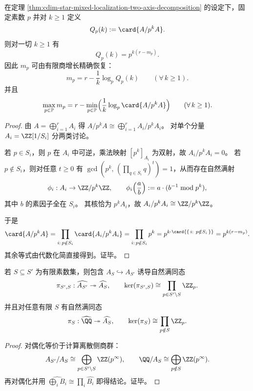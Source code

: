 \begin{theorem}[素幂粗分辨率的有限商增长谱与素数多重度反演]\label{thm:cdim-star-mixed-localization-pk-growth-inversion}
在定理 \ref{thm:cdim-star-mixed-localization-two-axis-decomposition} 的设定下，固定素数 \(p\) 并对 \(k\ge 1\) 定义
\[
Q_p(k):=\card{A/p^{k}A}.
\]
则对一切 \(k\ge 1\) 有
\[
Q_p(k)=p^{k(r-m_p)}.
\]
因此 \(m_p\) 可由有限商增长精确恢复：
\[
m_p=r-\frac{1}{k}\log_{p}Q_p(k)\qquad(\forall\,k\ge 1).
\]
并且
\[
\max_{p\in\mathbb P}m_p
=
r-\min_{p\in\mathbb P}\Bigl(\frac{1}{k}\log_p\card{A/p^kA}\Bigr)\qquad(\forall\,k\ge 1).
\]
\end{theorem}
\begin{proof}
由 \(A=\bigoplus_{i=1}^{r}A_i\) 得 \(A/p^{k}A\cong\bigoplus_{i=1}^{r}A_i/p^{k}A_i\)。
对单个分量 \(A_i=\ZZ[1/S_i]\) 分两类讨论。
\par
若 \(p\in S_i\)，则 \(p\) 在 \(A_i\) 中可逆，乘法映射 \([p^k]_{A_i}\) 为双射，故 \(A_i/p^{k}A_i=0\)。
若 \(p\notin S_i\)，则对任意 \(t\ge 0\) 有 \(\gcd(p^k,\,(\prod_{q\in S_i}q)^t)=1\)，从而存在自然满射
\[
\phi_i:A_i\to \ZZ/p^{k}\ZZ,
\qquad
\phi_i\!\left(\frac{a}{b}\right):=a\cdot(b^{-1}\bmod p^{k}),
\]
其中 \(b\) 的素因子全在 \(S_i\)。
其核恰为 \(p^{k}A_i\)，故 \(A_i/p^{k}A_i\cong \ZZ/p^{k}\ZZ\)。
\par
于是
\[
\card{A/p^{k}A}
=\prod_{i:\,p\notin S_i}\card{A_i/p^{k}A_i}
=\prod_{i:\,p\notin S_i}p^{k}
=p^{k\cdot \card{\{\,i:\ p\notin S_i\,\}}}
=p^{k(r-m_p)}.
\]
其余等式由代数化简直接得到。证毕。
\end{proof}

\begin{proposition}[有限素数截断映射的核]\label{prop:cdim-star-finite-prime-truncation-kernels}
若 \(S\subseteq S'\) 为有限素数集，则包含 \(A_S\hookrightarrow A_{S'}\) 诱导自然满同态
\[
\pi_{S',S}:\widehat{A_{S'}}\twoheadrightarrow \widehat{A_S},
\qquad
\ker(\pi_{S',S})\cong \prod_{p\in S'\setminus S}\ZZ_p.
\]
并且对任意有限 \(S\) 有自然满同态
\[
\pi_S:\widehat{\QQ}\twoheadrightarrow \widehat{A_S},
\qquad
\ker(\pi_S)\cong \prod_{p\notin S}\ZZ_p.
\]
\end{proposition}
\begin{proof}
对偶化等价于计算离散侧商群：
\[
A_{S'}/A_S\cong \bigoplus_{p\in S'\setminus S}\ZZ(p^\infty),\qquad
\QQ/A_S\cong \bigoplus_{p\notin S}\ZZ(p^\infty).
\]
再对偶化并用
\(
\widehat{\bigoplus_i B_i}\cong \prod_i \widehat{B_i}
\)
即得结论。证毕。
\end{proof}

